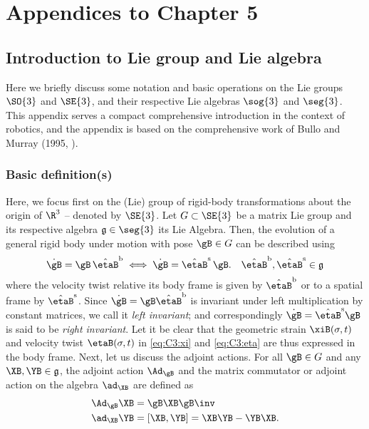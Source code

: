 \chapter{Appendices to Chapter 5}
\section{Introduction to Lie group and Lie algebra} 
\label{app:C3:liegroup}
Here we briefly discuss some notation and basic operations on the Lie groups $\SO{3}$ and $\SE{3}$, and their respective Lie algebras $\sog{3}$ and $\seg{3}$. This appendix serves a compact comprehensive introduction in the context of robotics, and the appendix is based on the comprehensive work of Bullo and Murray (1995, \cite{Bullo1995}).

\subsection{Basic definition(s)}
Here, we focus first on the (Lie) group of rigid-body transformations about the origin of $\R^3$ -- denoted by $\SE{3}$. Let $G \subset \SE{3}$ be a matrix Lie group and its respective algebra $\mathfrak{g} \in \seg{3}$ its Lie Algebra. Then, the evolution of a general rigid body under motion with pose $\gB \in G$ can be described using 
%
\begin{equation}
\dot{\gB} = \gB\, \hat{\etaB}^{\textrm{b}} \;  \Longleftrightarrow  \; \dot{\gB} = \hat{\etaB}^{\textrm{s}}\,\gB. \quad \hat{\etaB}^{\textrm{b}},\hat{\etaB}^{\textrm{s}} \in \mathfrak{g}
\end{equation}
%
where the velocity twist relative its body frame is given by $\hat{\etaB}^\textrm{b}$ or to a spatial frame by $\hat{\etaB}^\textrm{s}$. Since $\dot{\gB} = \gB \hat{\etaB}^{\textrm{b}}$ is invariant under left multiplication by constant matrices, we call it \textit{left invariant}; and correspondingly $\dot{\gB} = \hat{\etaB}^{\textrm{s}} \gB $ is said to be \textit{right invariant}. Let it be clear that the geometric strain $\xiB(\sigma,t)$ and velocity twist $\etaB(\sigma,t)$ in \eqref{eq:C3:xi} and \eqref{eq:C3:eta} are thus expressed in the body frame. Next, let us discuss the adjoint actions. For all $\gB \in G$ and any $\XB,\YB \in \mathfrak{g}$, the adjoint action $\Ad_{\gB}$ and the matrix commutator or adjoint action on the algebra $\ad_{\XB}$ are defined as 
%
\begin{align}
\Ad_{\gB} \XB & = \gB \XB \gB \inv \label{eq:C3:A1:adjoint1}\\
\ad_{\XB} \YB & = \left[\XB,\YB\right]  = \XB \YB - \YB\XB. \label{eq:C3:A1:adjoint2}
\end{align}
